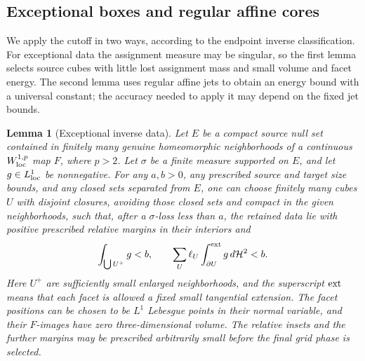 \documentclass[11pt]{article}
\numberwithin{equation}{section}
\newtheorem{lemma}[theorem]{Lemma}
\theoremstyle{definition}
\theoremstyle{remark}
\begin{document}
\subsection{Exceptional boxes and regular affine cores}

We apply the cutoff in two ways, according to the endpoint inverse
classification.  For exceptional data the assignment measure may be
singular, so the first lemma selects source cubes with little lost
assignment mass and small volume and facet energy.  The second lemma
uses regular affine jets to obtain an energy bound with a universal
constant; the accuracy needed to apply it may depend on the fixed jet
bounds.

\begin{lemma}[Exceptional inverse data]\label{hp:exceptional-boxes}
Let $E$ be a compact source null set contained in finitely many genuine
homeomorphic neighborhoods of a continuous $W^{1,p}_{\rm loc}$ map
$F$, where $p>2$.  Let $\sigma$ be a finite measure supported on $E$,
and let $g\in L^1_{\rm loc}$ be nonnegative.  For any $a,b>0$, any
prescribed source and target size bounds, and any closed sets separated
from $E$, one can choose finitely many cubes $U$ with disjoint closures,
avoiding those closed sets and compact in the given neighborhoods,
such that, after a $\sigma$-loss less than $a$, the retained data lie
with positive prescribed relative margins in their interiors and
\begin{equation}\label{hp:exceptional-cube-budget}
 \int_{\bigcup U^+}g< b,
 \qquad
 \sum_U\ell_U\int_{\partial U}^{\rm ext}g\,d\mathcal H^2<b.
\end{equation}
Here $U^+$ are sufficiently small enlarged neighborhoods, and the
superscript $\rm ext$ means that each facet is allowed a fixed small
tangential extension.  The facet positions can be chosen to be
$L^1$ Lebesgue points in their normal variable, and their $F$-images
have zero three-dimensional volume.  The relative insets and the
further margins may be prescribed arbitrarily small before the final
grid phase is selected.
\end{lemma}
\end{document}
